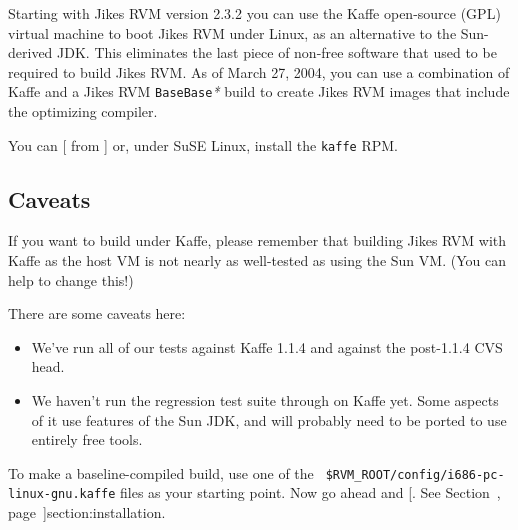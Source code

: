 \newcommand{\rvmbuild}[1]{\$RVM\_BUILD\texttt{/#1}}%
\newcommand{\gft}{\texttt{GenerateFromTemplate}}%
\newcommand{\gid}{\texttt{GenerateInterfaceDeclarations}}%
\newcommand{\biw}{\texttt{BootImageWriter}}%
%
%
Starting with Jikes RVM version 2.3.2 you can use the Kaffe open-source (GPL)
virtual machine to boot Jikes RVM under Linux, as an alternative to
the Sun-derived JDK.  This eliminates the last piece of non-free
software that used to be required to build Jikes RVM.  As of
March 27, 2004, you can use a combination of Kaffe and a Jikes RVM
\texttt{BaseBase}\textit{*} build to create Jikes RVM images that
include the optimizing compiler.

You can [ from {\tt \KaffeURL}]{\KaffeURL} or,
under SuSE Linux, install the {\tt kaffe} RPM.  

\subsection{Caveats}

If you want to build under Kaffe, please remember that building Jikes
RVM with Kaffe as the host VM is not nearly as well-tested as using
the Sun VM.  (You can help to change this!)

There are some caveats here:

\begin{itemize}

\item We've run all of our tests against Kaffe 1.1.4 and against the
post-1.1.4 CVS head.



\item We haven't run the regression test suite through on Kaffe yet.
  Some aspects of it use features of the Sun JDK, and will probably
  need to be ported to use entirely free tools.

\end{itemize}

To make a baseline-compiled build, use one of the {\tt
\$RVM\_\-ROOT/config/i686-pc-linux-gnu.kaffe{\it *}} files as your
starting point.  Now go ahead and [.  See Section~\Ref,
page~\Pageref]{section:installation}.


